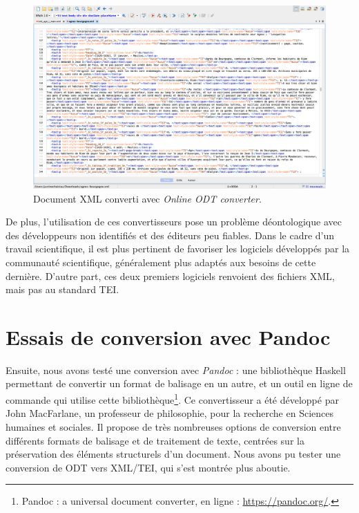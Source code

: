 \begin{figure}[H]
    \centering
    \includegraphics[scale=0.31]{img/onlineconvertfree.png}
    \caption{Document XML converti avec \textit{Online ODT converter}.}
    \label{fig:online_odt_converter}
\end{figure}

\par De plus, l’utilisation de ces convertisseurs pose un problème déontologique avec des développeurs non identifiés et des éditeurs peu fiables. Dans le cadre d’un travail scientifique, il est plus pertinent de favoriser les logiciels développés par la communauté scientifique, généralement plus adaptés aux besoins de cette dernière. D'autre part, ces deux premiers logiciels renvoient des fichiers XML, mais pas au standard TEI.

\newpage 

\section{Essais de conversion avec Pandoc}
\label{II.4.2}

\par Ensuite, nous avons testé une conversion avec \textit{Pandoc} : une bibliothèque Haskell permettant de convertir un format de balisage en un autre, et un outil en ligne de commande qui utilise cette bibliothèque\footnote{Pandoc : a universal document converter, en ligne : \url{https://pandoc.org/}.}. Ce convertisseur a été développé par John MacFarlane, un professeur de philosophie, pour la recherche en Sciences humaines et sociales. Il propose de très nombreuses options de conversion entre différents formats de balisage et de traitement de texte, centrées sur la préservation des éléments structurels d’un document. Nous avons pu tester une conversion de ODT vers XML/TEI, qui s’est montrée plus aboutie. 

